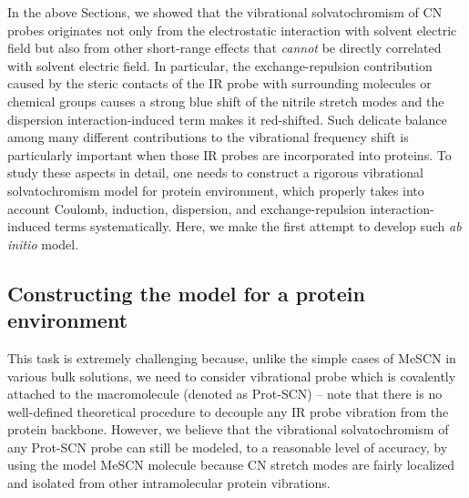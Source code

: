 \documentclass[a4paper,titlepage,twoside,fleqn,12pt]{book}
\begin{document}
\begin{refsection}
In the above Sections, we showed that the vibrational
solvatochromism of CN probes originates not only from the
electrostatic interaction with solvent electric field but also
from other short\hyp{}range effects that \emph{cannot} be directly
correlated with solvent electric field. In particular, the
exchange\hyp{}repulsion contribution caused by the steric contacts
of the IR probe with surrounding molecules or chemical groups
causes a strong blue shift of the nitrile stretch modes and the
dispersion interaction\hyp{}induced term makes it red\hyp{}shifted. Such
delicate balance among many different contributions to the
vibrational frequency shift is particularly important when
those IR probes are incorporated into proteins. To study these
aspects in detail, one needs to construct a rigorous vibrational
solvatochromism model for protein environment, which
properly takes into account Coulomb, induction, dispersion,
and exchange\hyp{}repulsion interaction\hyp{}induced terms
systematically. Here, we make the first attempt to develop
such \emph{ab initio} model.

\subsection{Constructing the model for a protein environment}

This task is
extremely challenging because, unlike the simple cases of
MeSCN in various bulk solutions, we need to consider
vibrational probe which is covalently attached to the
macromolecule (denoted as Prot-SCN) -- note that there is no
well\hyp{}defined theoretical procedure to decouple any IR probe
vibration from the protein backbone. However, we believe
that the vibrational solvatochromism of any Prot-SCN probe
can still be modeled, to a reasonable level of accuracy, by
using the model MeSCN molecule because CN stretch modes
are fairly localized and isolated from other intramolecular
protein vibrations.


\end{refsection}
\end{document}
